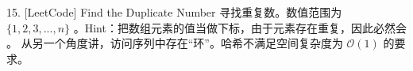 \documentclass[letterpaper,10pt,english]{sphinxmanual}
\begin{document}
\begin{quote}
\begin{sphinxVerbatim}[commandchars=\\\{\},numbers=left,firstnumber=1,stepnumber=1]
               
         
\end{sphinxVerbatim}
\end{quote}

15. {[}LeetCode{]} Find the Duplicate Number 寻找重复数。数值范围为 \(\{ 1,2,3,...,n \}\) 。Hint：把数组元素的值当做下标，由于元素存在重复，因此必然会  。
从另一个角度讲，访问序列中存在“环”。哈希不满足空间复杂度为 \(\mathcal{O}(1)\) 的要求。
\end{document}
